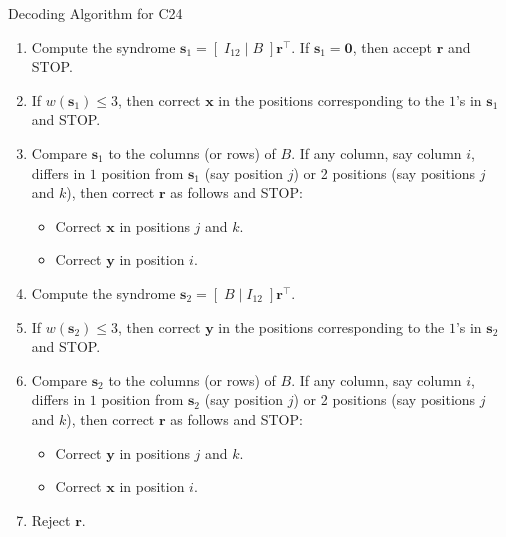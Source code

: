 \begin{algbox}
    \begin{algorithm}[H]
        \caption{Decoding Algorithm for C24}
        \begin{enumerate}[(1)]
            \item Compute the syndrome $ \bm{s}_1=\left[\;I_{12}\mid B\;\right]\bm{r}^\top $.
                  If $ \bm{s}_1=\bm{0} $, then accept $ \bm{r} $ and STOP.
            \item If $ w(\bm{s}_1)\leqslant 3 $, then correct $ \bm{x} $ in the positions
                  corresponding to the $ 1 $'s in $ \bm{s}_1 $ and STOP.
            \item Compare $ \bm{s}_1 $ to the columns (or rows) of $ B $. If any column,
                  say column $ i $, differs in $ 1 $ position  from $ \bm{s}_1 $ (say position $ j $) or
                  2 positions (say positions $ j $ and $ k $), then correct $ \bm{r} $
                  as follows and STOP:
                  \begin{itemize}
                      \item Correct $ \bm{x} $ in positions $ j $ and $ k $.
                      \item Correct $ \bm{y} $ in position $ i $.
                  \end{itemize}
            \item Compute the syndrome $ \bm{s}_2=\left[\;B\mid I_{12}\;\right]\bm{r}^\top $.
            \item If $ w(\bm{s}_2)\leqslant 3 $, then correct $ \bm{y} $ in the positions
                  corresponding to the $ 1 $'s in $ \bm{s}_2 $ and STOP.
            \item Compare $ \bm{s}_2 $ to the columns (or rows) of $ B $. If any column,
                  say column $ i $, differs in $ 1 $ position from $ \bm{s}_2 $ (say position $ j $) or
                  2 positions (say positions $ j $ and $ k $), then correct $ \bm{r} $
                  as follows and STOP:
                  \begin{itemize}
                      \item Correct $ \bm{y} $ in positions $ j $ and $ k $.
                      \item Correct $ \bm{x} $ in position $ i $.
                  \end{itemize}
            \item Reject $ \bm{r} $.
        \end{enumerate}
    \end{algorithm}
\end{algbox}

